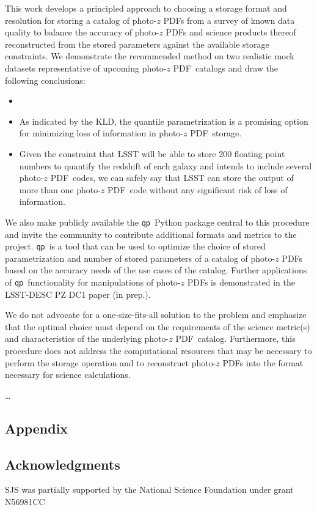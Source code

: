 \documentclass[\docopts]{\docclass}
\newcommand{\qp}{\texttt{qp}}
\newcommand{\pz}{photo-$z$ PDF}
\begin{document}
This work develops a principled approach to choosing a storage format and 
resolution for storing a catalog of \pz s from a survey of known data quality 
to balance the accuracy of \pz s and science products thereof reconstructed 
from the stored parameters against the available storage constraints.  We 
demonstrate the recommended method on two realistic mock datasets 
representative of upcoming \pz\ catalogs and draw the following conclusions:
\begin{itemize}
  \item
  \item As indicated by the KLD, the quantile parametrization is a promising 
option for minimizing loss of information in \pz\ storage.
  \item Given the constraint that LSST will be able to store 200 floating point 
numbers to quantify the redshift of each galaxy and intends to include several 
\pz\ codes, we can safely say that LSST can store the output of more than one 
\pz\ code without any significant risk of loss of information.
\end{itemize}

We also make publicly available the \qp\ Python package central to this 
procedure and invite the community to contribute additional formats and metrics 
to the project.  \qp\ is a tool that can be used to optimize the choice of 
stored parametrization and number of stored parameters of a catalog of \pz s 
based on the accuracy needs of the use cases of the catalog.  Further 
applications of \qp\ functionality for manipulations of \pz s is demonstrated 
in the LSST-DESC PZ DC1 paper (in prep.).

We do not advocate for a one-size-fits-all solution to the problem and 
emphasize that the optimal choice must depend on the requirements of the 
science metric(s) and characteristics of the underlying \pz\ catalog.  
Furthermore, this procedure does not address the computational resources that 
may be necessary to perform the storage operation and to reconstruct \pz s into 
the format necessary for science calculations.

\dots


\subsection*{Appendix}
\label{sec:kld}


\subsection*{Acknowledgments}


SJS was partially supported by the National Science Foundation under grant 
N56981CC








\end{document}
